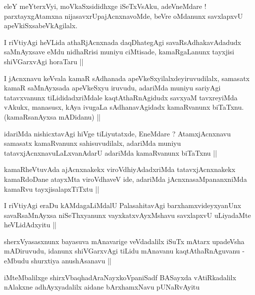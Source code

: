 
\begin{artha}
eleY meYterxVyi, moVkaSxsididhxge iSeTxVsAku, adeVneMdare ! parxtayxgAtamxna nijasavxrUpajAcnxnavoMde, beVre oMdanunx savxlapxvU apeVkiSxsabeVkAgilalx.
\end{artha}


\begin{artha}
I riVtiyAgi heVLida athaRjAcnxnada daqDhategAgi savaRsAdhakavAdadudx saMnAyxsave eMdu nidhaRrisi muniyu ciMtisade, kamaRgaLanunx tayxjisi shiVGarxvAgi horaTaru ||
\end{artha}


\begin{artha}
I jAcnxnavu keVvala kamaR sAdhanada apeVkeSxyilalxdeyiruvudilalx, samasatx kamaR saMnAyxsada apeVkeSxyu iruvudu, adariMda muniyu sariyAgi tatavxvanunx tiLididadxriMdale kaqtAthaRnAgidudx savxyaM tavxreyiMda vAkukx, manasusx, kAya ivugaLa sAdhanavAgidadx kamaRvanunx biTaTxnu. (kamaRsanAyxsa mADidanu) ||
\end{artha}


\begin{artha}
idariMda nishicxtavAgi hiVge tiLiyutatxde, EneMdare ? AtamxjAcnxnavu samasatx kamaRvanunx sahisuvudilalx, adariMda muniyu tatavxjAcnxnavuLaLxvanAdarU adariMda kamaRvanunx biTaTxnu ||
\end{artha}


\begin{artha}
kamaRheVtuvAda ajAcnxnakekx viroVdhiyAdadxriMda tatavxjAcnxnakekx kamaRdoDane atayxMta viroVdhaveV ide, adariMda jAcnxnasaMpananxniMda kamaRvu tayxjisalapxTiTxtu ||
\end{artha}

\begin{artha}
I riVtiyAgi eraDu kAMdagaLiMdalU PalasahitavAgi barxhamxvideyxyanUnx savaRsaMnAyxsa niSeThxyanunx vayxkatxvAyxMshavu savxlapxvU uLiyadaMte heVLidAdxyitu ||
\end{artha}

\begin{artha}
sherxVyasasxnunx bayasuva mAnavarige veVdadalilx iSuTx mAtarx upadeVsha mADiruvudu, idanunx shiVGarxvAgi tiLidu mAnavanu kaqtAthaRnAguvanu - eMbudu shurxtiya anushAsanavu ||
\end{artha}

\begin{center}
iMteMbalilxge shirxVbaqhadAraNayxkoVpaniSadf BASayxda vAtiRkadalilx nAlakxne adhAyxyadalilx aidane bArxhamxNavu pUNaRvAyitu
\end{center}



